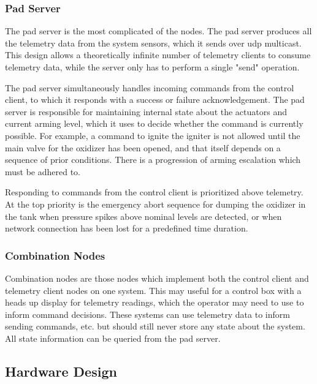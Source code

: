 \subsubsection{Pad Server}

The pad server is the most complicated of the nodes. The pad server produces all the telemetry data from the system
sensors, which it sends over \gls{udp} multicast. This design allows a theoretically infinite number of telemetry
clients to consume telemetry data, while the server only has to perform a single "send" operation.

The pad server simultaneously handles incoming commands from the control client, to which it responds with a success or
failure acknowledgement. The pad server is responsible for maintaining internal state about the actuators and current
arming level, which it uses to decide whether the command is currently possible. For example, a command to ignite the
igniter is not allowed until the main valve for the oxidizer has been opened, and that itself depends on a sequence of
prior conditions. There is a progression of arming escalation which must be adhered to.

Responding to commands from the control client is prioritized above telemetry. At the top priority is the emergency
abort sequence for dumping the oxidizer in the tank when pressure spikes above nominal levels are detected, or when
network connection has been lost for a predefined time duration.

\subsubsection{Combination Nodes}

Combination nodes are those nodes which implement both the control client and telemetry client nodes on one system. This
may useful for a control box with a heads up display for telemetry readings, which the operator may need to use to
inform command decisions. These systems can use telemetry data to inform sending commands, etc. but should still never
store any state about the system. All state information can be queried from the pad server.

\subsection{Hardware Design}
